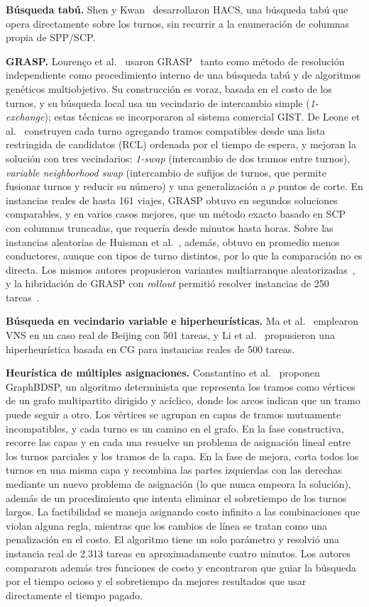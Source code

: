 \documentclass[letter, 10pt]{article}
\begin{document}
\textbf{Búsqueda tabú.} Shen y Kwan~\cite{ShenKwan2001} desarrollaron HACS, una búsqueda tabú que opera directamente sobre los turnos, sin recurrir a la enumeración de columnas propia de SPP/SCP.

\textbf{GRASP.} Lourenço et al.~\cite{Lourenco2001} usaron GRASP~\cite{FeoResende1995} tanto como método de resolución independiente como procedimiento interno de una búsqueda tabú y de algoritmos genéticos multiobjetivo. Su construcción es voraz, basada en el costo de los turnos, y su búsqueda local usa un vecindario de intercambio simple (\emph{1-exchange}); estas técnicas se incorporaron al sistema comercial GIST. De Leone et al.~\cite{DeLeone2011a} construyen cada turno agregando tramos compatibles desde una lista restringida de candidatos (RCL) ordenada por el tiempo de espera, y mejoran la solución con tres vecindarios: \emph{1-swap} (intercambio de dos tramos entre turnos), \emph{variable neighborhood swap} (intercambio de sufijos de turnos, que permite fusionar turnos y reducir su número) y una generalización a $\rho$ puntos de corte. En instancias reales de hasta 161 viajes, GRASP obtuvo en segundos soluciones comparables, y en varios casos mejores, que un método exacto basado en SCP con columnas truncadas, que requería desde minutos hasta horas. Sobre las instancias aleatorias de Huisman et al.~\cite{Huisman2005}, además, obtuvo en promedio menos conductores, aunque con tipos de turno distintos, por lo que la comparación no es directa. Los mismos autores propusieron variantes multiarranque aleatorizadas~\cite{DeLeone2011b}, y la hibridación de GRASP con \emph{rollout} permitió resolver instancias de 250 tareas~\cite{DAnnibale2007,Constantino2017}.

\textbf{Búsqueda en vecindario variable e hiperheurísticas.} Ma et al.~\cite{Ma2016} emplearon VNS en un caso real de Beijing con 501 tareas, y Li et al.~\cite{Li2015} propusieron una hiperheurística basada en CG para instancias reales de 500 tareas.

\textbf{Heurística de múltiples asignaciones.} Constantino et al.~\cite{Constantino2017} proponen GraphBDSP, un algoritmo determinista que representa los tramos como vértices de un grafo multipartito dirigido y acíclico, donde los arcos indican que un tramo puede seguir a otro. Los vértices se agrupan en capas de tramos mutuamente incompatibles, y cada turno es un camino en el grafo. En la fase constructiva, recorre las capas y en cada una resuelve un problema de asignación lineal entre los turnos parciales y los tramos de la capa. En la fase de mejora, corta todos los turnos en una misma capa y recombina las partes izquierdas con las derechas mediante un nuevo problema de asignación (lo que nunca empeora la solución), además de un procedimiento que intenta eliminar el sobretiempo de los turnos largos. La factibilidad se maneja asignando costo infinito a las combinaciones que violan alguna regla, mientras que los cambios de línea se tratan como una penalización en el costo. El algoritmo tiene un solo parámetro y resolvió una instancia real de 2.313 tareas en aproximadamente cuatro minutos. Los autores compararon además tres funciones de costo y encontraron que guiar la búsqueda por el tiempo ocioso y el sobretiempo da mejores resultados que usar directamente el tiempo pagado.
\end{document}
